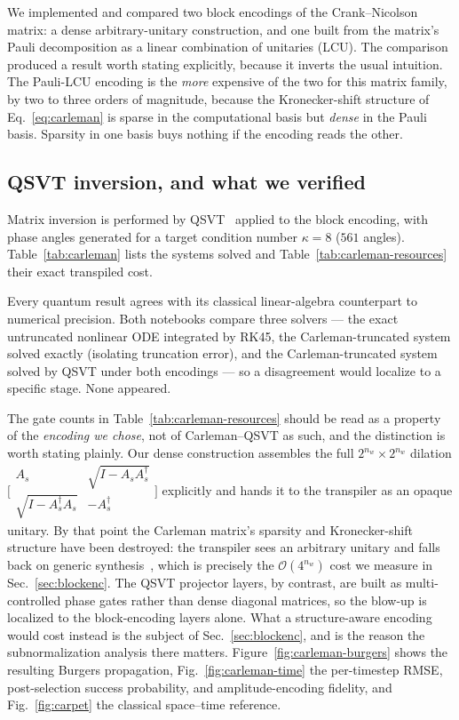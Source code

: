 \documentclass[aps,prx,twocolumn,notitlepage,superscriptaddress,floatfix,10pt]{revtex4-2}
\newcommand{\Oh}{\mathcal{O}}
\begin{document}
We implemented and compared two block encodings of the Crank--Nicolson matrix: a dense
arbitrary-unitary construction, and one built from the matrix's Pauli decomposition as a linear
combination of unitaries (LCU). The comparison produced a result worth stating explicitly, because
it inverts the usual intuition. The Pauli-LCU encoding is the \emph{more} expensive of the two for
this matrix family, by two to three orders of magnitude, because the Kronecker-shift structure of
Eq.~\eqref{eq:carleman} is sparse in the computational basis but \emph{dense} in the Pauli basis.
Sparsity in one basis buys nothing if the encoding reads the other.

\subsection{QSVT inversion, and what we verified}

Matrix inversion is performed by QSVT~\cite{Gilyen2019} applied to the block encoding, with phase
angles generated for a target condition number $\kappa=8$ ($561$ angles). Table~\ref{tab:carleman}
lists the systems solved and Table~\ref{tab:carleman-resources} their exact transpiled cost.

Every quantum result agrees with its classical linear-algebra counterpart to numerical precision.
Both notebooks compare three solvers --- the exact untruncated nonlinear ODE integrated by RK45, the
Carleman-truncated system solved exactly (isolating truncation error), and the Carleman-truncated
system solved by QSVT under both encodings --- so a disagreement would localize to a specific stage.
None appeared.

The gate counts in Table~\ref{tab:carleman-resources} should be read as a property of the
\emph{encoding we chose}, not of Carleman--QSVT as such, and the distinction is worth stating
plainly. Our dense construction assembles the full $2^{n_w}\times2^{n_w}$ dilation
$\big[\begin{smallmatrix} A_s & \sqrt{I-A_sA_s^\dagger}\\ \sqrt{I-A_s^\dagger A_s} &
-A_s^\dagger\end{smallmatrix}\big]$ explicitly and hands it to the transpiler as an opaque unitary.
By that point the Carleman matrix's sparsity and Kronecker-shift structure have been destroyed: the
transpiler sees an arbitrary unitary and falls back on generic
synthesis~\cite{Shende2006}, which is precisely the $\Oh(4^{n_w})$ cost we measure in
Sec.~\ref{sec:blockenc}. The QSVT projector layers, by contrast, are built as multi-controlled phase
gates rather than dense diagonal matrices, so the blow-up is localized to the block-encoding layers
alone. What a structure-aware encoding would cost instead is the subject of
Sec.~\ref{sec:blockenc}, and is the reason the subnormalization analysis there matters. Figure~\ref{fig:carleman-burgers} shows the resulting Burgers propagation,
Fig.~\ref{fig:carleman-time} the per-timestep RMSE, post-selection success probability, and
amplitude-encoding fidelity, and Fig.~\ref{fig:carpet} the classical space--time reference.
\end{document}

